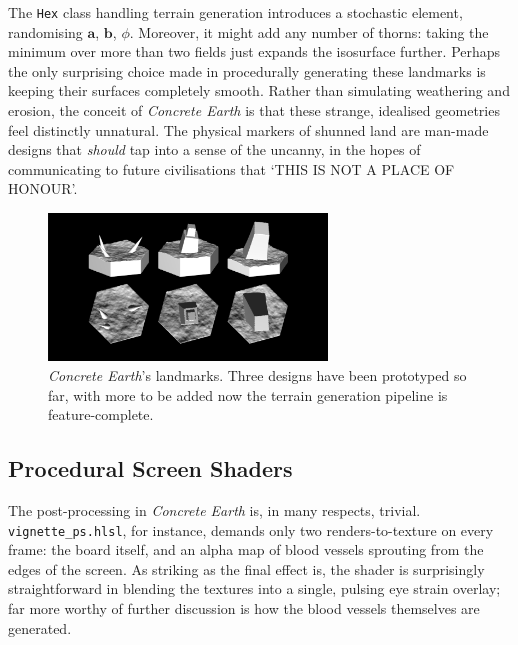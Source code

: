 \documentclass[a4paper, 11pt]{article}
\begin{document}
\begin{flushleft}
\vspace{5pt}\noindent
The \texttt{Hex} class handling terrain generation introduces a stochastic element, randomising $\mathbf{a}$, $\mathbf{b}$, $\phi$. Moreover, it might add any number of thorns: taking the minimum over more than two fields just expands the isosurface further. Perhaps the only surprising choice made in procedurally generating these landmarks is keeping their surfaces completely smooth. Rather than simulating weathering and erosion, the conceit of \textit{Concrete Earth} is that these strange, idealised geometries feel distinctly unnatural. The physical markers of shunned land are man-made designs that \textit{should} tap into a sense of the uncanny, in the hopes of communicating to future civilisations that `THIS IS NOT A PLACE OF HONOUR'.  %

\vspace{5pt}\noindent
\begin{figure}[h]
\centering
\includegraphics[width=0.66\textwidth]{Landmarks}
\caption{\textit{Concrete Earth}'s landmarks.  Three designs have been prototyped so far, with more to be added now the terrain generation pipeline is feature-complete.}
\label{Landmarks}
\end{figure}

\subsection{Procedural Screen Shaders}\label{Procedural Screen Shaders} %

The post-processing in \textit{Concrete Earth} is, in many respects, trivial. \texttt{vignette\_ps.hlsl}, for instance, demands only two renders-to-texture on every frame: the board itself, and an alpha map of blood vessels sprouting from the edges of the screen. As striking as the final effect is, the shader is surprisingly straightforward in blending the textures into a single, pulsing eye strain overlay; far more worthy of further discussion is how the blood vessels themselves are generated.


\end{flushleft}
\end{document}

